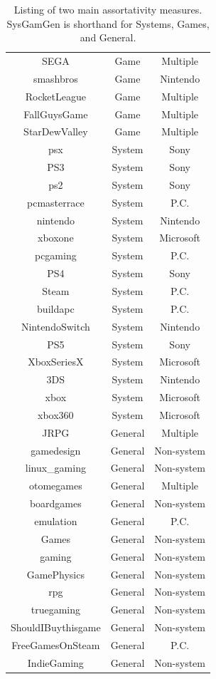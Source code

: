 \documentclass[12pt, a4paper]{article}
\begin{document}
\begin{table}
\begin{tabular} {c c c}
      SEGA & Game & Multiple \\
      smashbros & Game & Nintendo \\
      RocketLeague & Game & Multiple \\
      FallGuysGame & Game & Multiple \\
      StarDewValley & Game & Multiple \\
      psx & System & Sony \\
      PS3 & System & Sony \\
      ps2 & System & Sony \\
      pcmasterrace & System & P.C. \\
      nintendo & System & Nintendo \\
      xboxone & System & Microsoft \\
      pcgaming & System & P.C. \\
      PS4 & System & Sony \\
      Steam & System & P.C. \\
      buildapc & System & P.C. \\
      NintendoSwitch & System & Nintendo \\
      PS5 & System & Sony \\
      XboxSeriesX & System & Microsoft \\
      3DS & System & Nintendo \\
      xbox & System & Microsoft \\
      xbox360 & System & Microsoft \\
      JRPG & General & Multiple \\
      gamedesign & General & Non-system \\
      linux\_gaming & General & Non-system \\
      otomegames & General & Multiple \\
      boardgames & General & Non-system \\
      emulation & General & P.C. \\
      Games & General & Non-system \\
      gaming & General & Non-system \\
      GamePhysics & General & Non-system \\
      rpg & General & Non-system \\
      truegaming & General & Non-system \\
      ShouldIBuythisgame & General & Non-system \\
      FreeGamesOnSteam & General & P.C. \\
      IndieGaming & General & Non-system \\
      \hline
    \end{tabular}
    \caption{Listing of two main assortativity measures. SysGamGen is shorthand for Systems, Games, and General.}
    \label{tab:AssortSplit}
\end{table}
\end{document}
